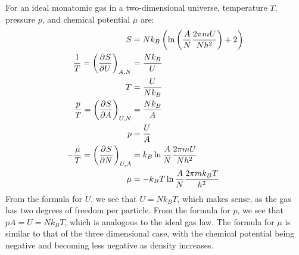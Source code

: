 \documentclass{article}
\begin{document}
\clearpage

For an ideal monatomic gas in a two-dimensional universe, temperature $T$, pressure $p$, and chemical potential $\mu$ are:
\begin{equation}
    \begin{split}
        S & = Nk_B\left(\ln\left(\frac{A}{N}\frac{2\pi mU}{Nh^{2}}\right) + 2\right) \\
        \frac{1}{T} = {\left(\frac{\partial^{}S} {\partial U^{}}\right)}_{A,N} & = \frac{Nk_B}{U} \\
        T & = \frac{U}{Nk_B} \\
        \frac{p}{T} = {\left(\frac{\partial^{}S} {\partial A^{}}\right)}_{U,N} & = \frac{Nk_B}{A} \\
        p & = \frac{U}{A} \\
        -\frac{\mu}{T} = {\left(\frac{\partial^{}S} {\partial N^{}}\right)}_{U,A} & = k_B\ln\frac{A}{N}\frac{2\pi mU}{Nh^{2}} \\
        \mu & = -k_B T\ln\frac{A}{N}\frac{2\pi mk_B T}{h^{2}} \\
    \end{split}
\end{equation}
From the formula for $U$, we see that $U = Nk_B T$, which makes sense, as the gas has two degrees of freedom per particle. From the formula for $p$, we see that $pA = U = Nk_B T$, which is analogous to the ideal gas law. The formula for $\mu$ is similar to that of the three dimensional case, with the chemical potential being negative and becoming less negative as density increases.

\clearpage
\end{document}

